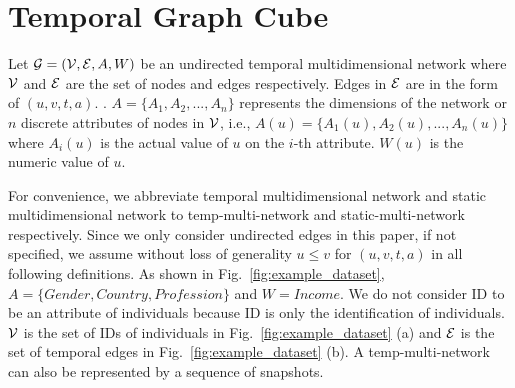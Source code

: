 \documentclass[10pt,journal,compsoc]{IEEEtran}
\begin{document}

\section{Temporal Graph Cube} \label{sec:temp_graph_cube}
\begin{definition}
	\label{def:temp_multi_network}
	Let $\mathcal{G}=(\mathcal{V}, \mathcal{E}, A, W)$ be an undirected temporal multidimensional network where $\mathcal{V}$ and $\mathcal{E}$ are the set of nodes and edges respectively. Edges in $\mathcal{E}$ are in the form of $(u, v, t, a)$. . $A=\{A_1, A_2, ... , A_n\}$ represents the dimensions of the network or $n$ discrete attributes of nodes in $ \mathcal{V} $, i.e., $A(u)=\{A_1(u), A_2(u), ... , A_n(u)\}$ where $A_i(u)$ is the actual value of $u$ on the $i$-th attribute. $ W(u) $ is the numeric value of $u$.
\end{definition}

For convenience, we abbreviate temporal multidimensional network and static multidimensional network to temp-multi-network and static-multi-network respectively. Since we only consider undirected edges in this paper, if not specified, we assume without loss of generality $u \leq v$ for $(u, v, t, a)$ in all following definitions. As shown in Fig.~\ref{fig:example_dataset}, $ A=\{Gender,Country,Profession\} $ and $ W=Income $. We do not consider ID to be an attribute of individuals because ID is only the identification of individuals. $ \mathcal{V} $ is the set of IDs of individuals in Fig.~\ref{fig:example_dataset} (a) and $ \mathcal{E} $ is the set of temporal edges in Fig.~\ref{fig:example_dataset} (b). A temp-multi-network can also be represented by a sequence of snapshots.
\end{document}
